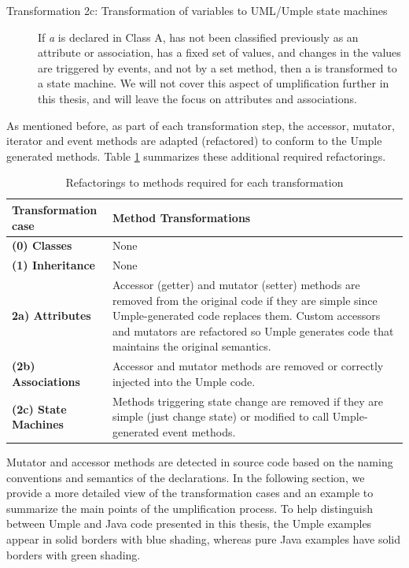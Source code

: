 \begin{description}
\begin{description}
	\item [Transformation 2c: Transformation of variables to UML/Umple state machines]
	If \textit{a} is declared in Class A, has not been classified previously as an attribute or association, has a fixed set of values, and changes in the values are triggered by events, and not by a set method, then a is transformed to a state machine.
We will not cover this aspect of umplification further in this thesis, and will leave the focus on attributes and associations.
\end{description}
\end{description}

As mentioned before, as part of each transformation step, the accessor, mutator, iterator and event methods are adapted (refactored) to conform to the Umple generated methods. Table \ref{table:transformations} summarizes these additional required refactorings. 

\begin{table}[htbp]
	\caption{Refactorings to methods required for each transformation}
	\label{table:transformations}
    \centering
    \begin{tabular}{ l | p{9cm} }
        \toprule
        \rowcolor[HTML]{BBDAFF}
       \textbf{ Transformation case  }   & \textbf{Method Transformations}
        \\ \midrule
        \textbf{(0)  Classes }        & None      \\ \hline
        \textbf{(1)  Inheritance}     & None       \\ \hline
        \textbf{2a)  Attributes}      & 
        Accessor (getter) and mutator (setter) methods are removed from the original code if they are simple since 		Umple-generated code replaces them. Custom accessors and mutators are refactored so Umple generates code 			that maintains the original
        semantics.         		\\ \hline
        \textbf{(2b) Associations }   & 
 		Accessor and mutator methods are removed or correctly injected into the Umple code.        
		\\ \hline
        \textbf{(2c) State Machines  }  & 
		Methods triggering state change are removed if they are simple (just change state) or modified to call 				Umple-generated event methods.  	
		\\ \bottomrule
    \end{tabular}
\end{table}
Mutator and accessor methods are detected in source code based on the naming conventions and semantics of the declarations.
In the following section, we provide a more detailed view of the transformation cases and an example to summarize the main points of the umplification process. To help distinguish between Umple and Java code presented in this thesis, the Umple examples appear in solid borders with blue shading, whereas pure Java examples have solid borders with green shading. 

